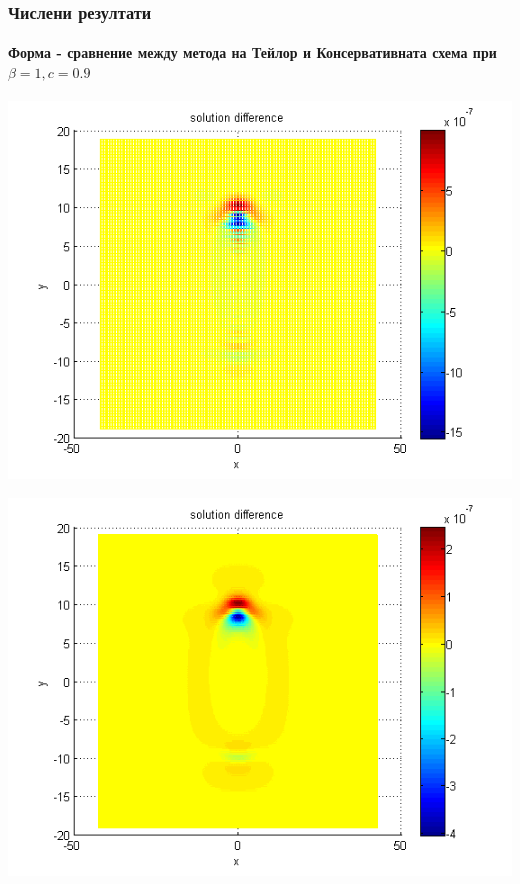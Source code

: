 \documentclass{beamer}
\begin{document}
\begin{frame}
\frametitle{Числени резултати}
\framesubtitle{Форма - сравнение между метода на Тейлор и Консервативната схема при $\beta = 1, c=0.9$}
\begin{center}\vspace{0.4cm}
	\begin{minipage}[b]{0.32\linewidth}
		\includegraphics[width=\linewidth]{../amitans/figures/compare_128_bt1_c09_h040.png}
	\end{minipage}	
	\begin{minipage}[b]{0.32\linewidth}
		\includegraphics[width=\linewidth]{../amitans/figures/compare_128_bt1_c09_h020.png}
	\end{minipage}	

\end{center}
\end{frame}
\end{document}
